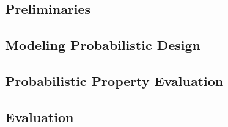 \subsection{Preliminaries}

\subsection{Modeling Probabilistic Design}

\subsection{Probabilistic Property Evaluation}

\subsection{Evaluation}